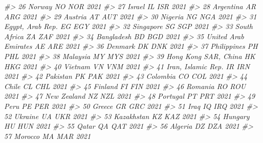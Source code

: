 \documentclass[
  xelatex, ja=standard]{bxjsbook}
\newenvironment{Shaded}{\begin{snugshade}}{\end{snugshade}}
\newcommand{\CommentTok}[1]{\textcolor[rgb]{0.56,0.35,0.01}{\textit{#1}}}
\theoremstyle{definition}
\theoremstyle{definition}
\theoremstyle{definition}
\theoremstyle{definition}
\theoremstyle{remark}
\begin{document}
\begin{Shaded}
\begin{Highlighting}[]
\CommentTok{\#\textgreater{} 26                          Norway    NO   NOR 2021}
\CommentTok{\#\textgreater{} 27                          Israel    IL   ISR 2021}
\CommentTok{\#\textgreater{} 28                       Argentina    AR   ARG 2021}
\CommentTok{\#\textgreater{} 29                         Austria    AT   AUT 2021}
\CommentTok{\#\textgreater{} 30                         Nigeria    NG   NGA 2021}
\CommentTok{\#\textgreater{} 31                Egypt, Arab Rep.    EG   EGY 2021}
\CommentTok{\#\textgreater{} 32                       Singapore    SG   SGP 2021}
\CommentTok{\#\textgreater{} 33                    South Africa    ZA   ZAF 2021}
\CommentTok{\#\textgreater{} 34                      Bangladesh    BD   BGD 2021}
\CommentTok{\#\textgreater{} 35            United Arab Emirates    AE   ARE 2021}
\CommentTok{\#\textgreater{} 36                         Denmark    DK   DNK 2021}
\CommentTok{\#\textgreater{} 37                     Philippines    PH   PHL 2021}
\CommentTok{\#\textgreater{} 38                        Malaysia    MY   MYS 2021}
\CommentTok{\#\textgreater{} 39            Hong Kong SAR, China    HK   HKG 2021}
\CommentTok{\#\textgreater{} 40                         Vietnam    VN   VNM 2021}
\CommentTok{\#\textgreater{} 41              Iran, Islamic Rep.    IR   IRN 2021}
\CommentTok{\#\textgreater{} 42                        Pakistan    PK   PAK 2021}
\CommentTok{\#\textgreater{} 43                        Colombia    CO   COL 2021}
\CommentTok{\#\textgreater{} 44                           Chile    CL   CHL 2021}
\CommentTok{\#\textgreater{} 45                         Finland    FI   FIN 2021}
\CommentTok{\#\textgreater{} 46                         Romania    RO   ROU 2021}
\CommentTok{\#\textgreater{} 47                     New Zealand    NZ   NZL 2021}
\CommentTok{\#\textgreater{} 48                        Portugal    PT   PRT 2021}
\CommentTok{\#\textgreater{} 49                            Peru    PE   PER 2021}
\CommentTok{\#\textgreater{} 50                          Greece    GR   GRC 2021}
\CommentTok{\#\textgreater{} 51                            Iraq    IQ   IRQ 2021}
\CommentTok{\#\textgreater{} 52                         Ukraine    UA   UKR 2021}
\CommentTok{\#\textgreater{} 53                      Kazakhstan    KZ   KAZ 2021}
\CommentTok{\#\textgreater{} 54                         Hungary    HU   HUN 2021}
\CommentTok{\#\textgreater{} 55                           Qatar    QA   QAT 2021}
\CommentTok{\#\textgreater{} 56                         Algeria    DZ   DZA 2021}
\CommentTok{\#\textgreater{} 57                         Morocco    MA   MAR 2021}

\end{Highlighting}
\end{Shaded}
\end{document}
